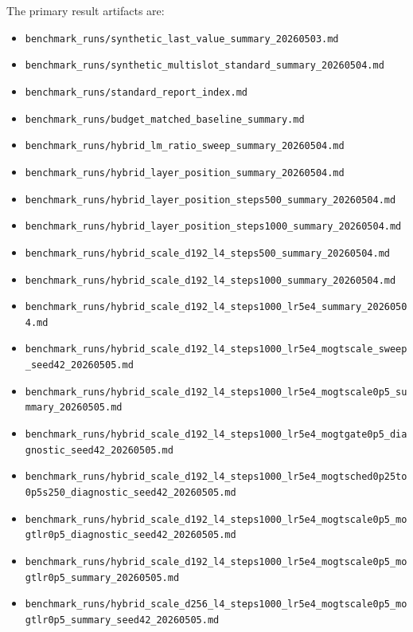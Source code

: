 \documentclass[10pt]{article}
\begin{document}
The primary result artifacts are:
\begin{itemize}
    \item \texttt{benchmark\_runs/synthetic\_last\_value\_summary\_20260503.md}
    \item \texttt{benchmark\_runs/synthetic\_multislot\_standard\_summary\_20260504.md}
    \item \texttt{benchmark\_runs/standard\_report\_index.md}
    \item \texttt{benchmark\_runs/budget\_matched\_baseline\_summary.md}
    \item \texttt{benchmark\_runs/hybrid\_lm\_ratio\_sweep\_summary\_20260504.md}
    \item \texttt{benchmark\_runs/hybrid\_layer\_position\_summary\_20260504.md}
    \item \texttt{benchmark\_runs/hybrid\_layer\_position\_steps500\_summary\_20260504.md}
    \item \texttt{benchmark\_runs/hybrid\_layer\_position\_steps1000\_summary\_20260504.md}
    \item \texttt{benchmark\_runs/hybrid\_scale\_d192\_l4\_steps500\_summary\_20260504.md}
    \item \texttt{benchmark\_runs/hybrid\_scale\_d192\_l4\_steps1000\_summary\_20260504.md}
    \item \texttt{benchmark\_runs/hybrid\_scale\_d192\_l4\_steps1000\_lr5e4\_summary\_20260504.md}
    \item \texttt{benchmark\_runs/hybrid\_scale\_d192\_l4\_steps1000\_lr5e4\_mogtscale\_sweep\_seed42\_20260505.md}
    \item \texttt{benchmark\_runs/hybrid\_scale\_d192\_l4\_steps1000\_lr5e4\_mogtscale0p5\_summary\_20260505.md}
    \item \texttt{benchmark\_runs/hybrid\_scale\_d192\_l4\_steps1000\_lr5e4\_mogtgate0p5\_diagnostic\_seed42\_20260505.md}
    \item \texttt{benchmark\_runs/hybrid\_scale\_d192\_l4\_steps1000\_lr5e4\_mogtsched0p25to0p5s250\_diagnostic\_seed42\_20260505.md}
    \item \texttt{benchmark\_runs/hybrid\_scale\_d192\_l4\_steps1000\_lr5e4\_mogtscale0p5\_mogtlr0p5\_diagnostic\_seed42\_20260505.md}
    \item \texttt{benchmark\_runs/hybrid\_scale\_d192\_l4\_steps1000\_lr5e4\_mogtscale0p5\_mogtlr0p5\_summary\_20260505.md}
    \item \texttt{benchmark\_runs/hybrid\_scale\_d256\_l4\_steps1000\_lr5e4\_mogtscale0p5\_mogtlr0p5\_summary\_seed42\_20260505.md}
\end{itemize}
\end{document}
